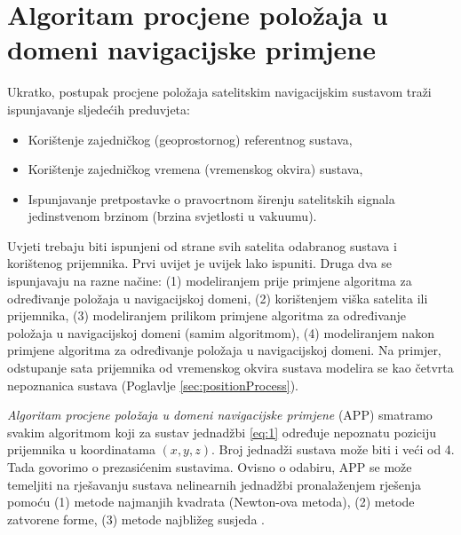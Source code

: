 \documentclass[a4paper,twoside,12pt]{memoir} %
\begin{document}
\chapter[Algoritam procjene položaja (APP)]{Algoritam procjene položaja u domeni navigacijske primjene}\label{sec:algoritam}
Ukratko, postupak procjene položaja satelitskim navigacijskim sustavom traži ispunjavanje sljedećih preduvjeta:
\begin{itemize}
	\item Korištenje zajedničkog (geoprostornog) referentnog sustava,
	\item Korištenje zajedničkog vremena (vremenskog okvira) sustava,
	\item Ispunjavanje pretpostavke o pravocrtnom širenju satelitskih signala jedinstvenom
	brzinom (brzina svjetlosti u vakuumu).
\end{itemize}
Uvjeti trebaju biti ispunjeni od strane svih satelita odabranog sustava i korištenog prijemnika.
Prvi uvijet je uvijek lako ispuniti. Druga dva se ispunjavaju na razne načine:
(1) modeliranjem prije primjene algoritma za određivanje položaja u navigacijskoj domeni, (2)
korištenjem viška satelita ili prijemnika, (3) modeliranjem prilikom primjene algoritma za određivanje položaja u navigacijskoj domeni (samim algoritmom), (4) modeliranjem nakon primjene algoritma za određivanje položaja u navigacijskoj domeni.
Na primjer, odstupanje sata prijemnika od vremenskog okvira sustava modelira se kao četvrta nepoznanica sustava 
(Poglavlje \ref{sec:positionProcess}).

\textit{Algoritam procjene položaja u domeni navigacijske primjene} (APP)
smatramo svakim algoritmom koji za sustav jednadžbi \ref{eq:1}
određuje nepoznatu poziciju prijemnika u koordinatama $(x,y,z)$.
Broj jednadži sustava može biti i veći od 4. Tada govorimo o prezasićenim sustavima.
Ovisno o odabiru, APP se može temeljiti na rješavanju sustava nelinearnih jednadžbi pronalaženjem rješenja pomoću (1) metode najmanjih kvadrata (Newton-ova metoda),
(2) metode zatvorene forme, (3) metode najbližeg susjeda \cite{math:positioning}. 
\end{document}
